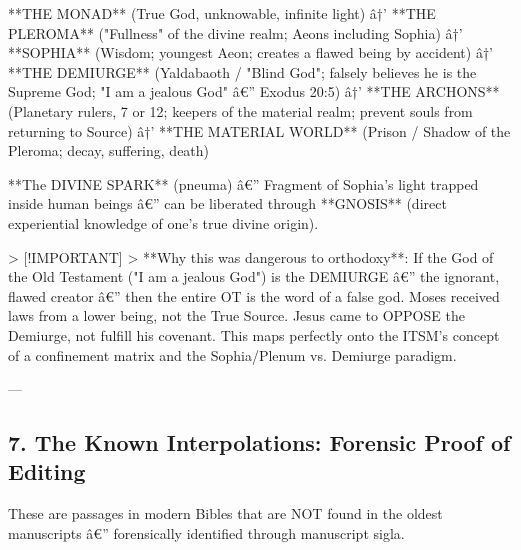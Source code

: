 \documentclass[aps,prd,11pt,onecolumn,superscriptaddress,nofootinbib,floatfix]{revtex4-2}
\begin{document}
**THE MONAD** (True God, unknowable, infinite light) â†'
**THE PLEROMA** ("Fullness" of the divine realm; Aeons including Sophia) â†'
**SOPHIA** (Wisdom; youngest Aeon; creates a flawed being by accident) â†'
**THE DEMIURGE** (Yaldabaoth / "Blind God"; falsely believes he is the Supreme God; "I am a jealous God" â€'' Exodus 20:5) â†'
**THE ARCHONS** (Planetary rulers, 7 or 12; keepers of the material realm; prevent souls from returning to Source) â†'
**THE MATERIAL WORLD** (Prison / Shadow of the Pleroma; decay, suffering, death)


**The DIVINE SPARK** (pneuma) â€'' Fragment of Sophia's light trapped inside human beings â€'' can be liberated through **GNOSIS** (direct experiential knowledge of one's true divine origin).


> [!IMPORTANT]
> **Why this was dangerous to orthodoxy**: If the God of the Old Testament ("I am a jealous God") is the DEMIURGE â€'' the ignorant, flawed creator â€'' then the entire OT is the word of a false god. Moses received laws from a lower being, not the True Source. Jesus came to OPPOSE the Demiurge, not fulfill his covenant. This maps perfectly onto the ITSM's concept of a confinement matrix and the Sophia/Plenum vs. Demiurge paradigm.


---


\subsection{7. The Known Interpolations: Forensic Proof of Editing}


These are passages in modern Bibles that are NOT found in the oldest manuscripts â€'' forensically identified through manuscript sigla.
\end{document}
